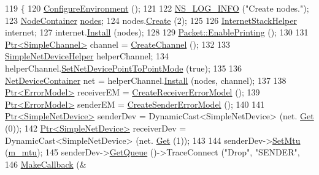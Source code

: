 \begin{DoxyCode}
119 \{
120   \hyperlink{classns3_1_1TcpGeneralTest_abd4e42807a8d2b13dcd207131af12c3b}{ConfigureEnvironment} ();
121 
122   \hyperlink{group__logging_gafbd73ee2cf9f26b319f49086d8e860fb}{NS\_LOG\_INFO} (\textcolor{stringliteral}{"Create nodes."});
123   \hyperlink{classns3_1_1NodeContainer}{NodeContainer} \hyperlink{visualizer-ideas_8txt_a3e1b3808014a2c68ab0cd0182e041be2}{nodes};
124   nodes.\hyperlink{classns3_1_1NodeContainer_a787f059e2813e8b951cc6914d11dfe69}{Create} (2);
125 
126   \hyperlink{classns3_1_1InternetStackHelper}{InternetStackHelper} internet;
127   internet.\hyperlink{classns3_1_1InternetStackHelper_a6645b412f31283d2d9bc3d8a95cebbc0}{Install} (nodes);
128 
129   \hyperlink{classns3_1_1Packet_ae17c0cd8e63e83df3c9273801e3d5d7f}{Packet::EnablePrinting} ();
130 
131   \hyperlink{classns3_1_1Ptr}{Ptr<SimpleChannel>} channel = \hyperlink{classns3_1_1TcpGeneralTest_a809e0bad8c6722d3a0fcd6747a231e35}{CreateChannel} ();
132 
133   \hyperlink{classns3_1_1SimpleNetDeviceHelper}{SimpleNetDeviceHelper} helperChannel;
134   helperChannel.\hyperlink{classns3_1_1SimpleNetDeviceHelper_a474460ba6942d4933f443a97df7d4716}{SetNetDevicePointToPointMode} (\textcolor{keyword}{true});
135 
136   \hyperlink{classns3_1_1NetDeviceContainer}{NetDeviceContainer} net = helperChannel.\hyperlink{classns3_1_1SimpleNetDeviceHelper_a35bed9cee32d306362d3e24dfeef4513}{Install} (nodes, channel);
137 
138   \hyperlink{classns3_1_1Ptr}{Ptr<ErrorModel>} receiverEM = \hyperlink{classns3_1_1TcpGeneralTest_a256082023d4a67738c946d66c175a6d9}{CreateReceiverErrorModel} ();
139   \hyperlink{classns3_1_1Ptr}{Ptr<ErrorModel>} senderEM   = \hyperlink{classns3_1_1TcpGeneralTest_aecdfb4a8465389c2ac5887597ba6014a}{CreateSenderErrorModel} ();
140 
141   \hyperlink{classns3_1_1Ptr}{Ptr<SimpleNetDevice>} senderDev = DynamicCast<SimpleNetDevice> (net.
      \hyperlink{classns3_1_1NetDeviceContainer_a677d62594b5c9d2dea155cc5045f4d0b}{Get} (0));
142   \hyperlink{classns3_1_1Ptr}{Ptr<SimpleNetDevice>} receiverDev = DynamicCast<SimpleNetDevice> (net.
      \hyperlink{classns3_1_1NetDeviceContainer_a677d62594b5c9d2dea155cc5045f4d0b}{Get} (1));
143 
144   senderDev->\hyperlink{classns3_1_1SimpleNetDevice_ab41676e626a91832291bcfbd55ee454a}{SetMtu} (\hyperlink{classns3_1_1TcpGeneralTest_a391718e29aac6692abf8ecfc5040e935}{m\_mtu});
145   senderDev->\hyperlink{classns3_1_1SimpleNetDevice_ab37f84da2d0755a6d353993dfa2cdc26}{GetQueue} ()->TraceConnect (\textcolor{stringliteral}{"Drop"}, \textcolor{stringliteral}{"SENDER"},
146                                         \hyperlink{group__makecallbackmemptr_ga9376283685aa99d204048d6a4b7610a4}{MakeCallback} (&

\end{DoxyCode}
